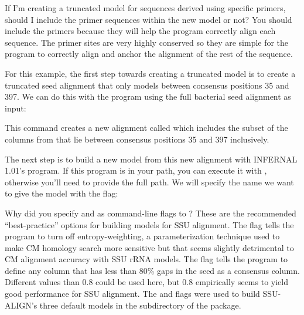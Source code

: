 \begin{srefaq}{If I'm creating a truncated model for sequences derived
    using specific primers, should I include the primer sequences
    within the new model or not?} You should include the primers
  because they will help the program correctly align each
  sequence. The primer sites are very highly conserved so they are
  simple for the program to correctly align and anchor the alignment
  of the rest of the sequence.
\end{srefaq}

For this example, the first step towards creating a truncated model is
to create a truncated seed alignment that only models between
consensus positions 35 and 397. We can do this with the
 program using the full bacterial seed alignment as
input:


This command creates a new alignment called  which
includes the subset of the columns from  that lie
between consensus positions 35 and 397 inclusively.

The next step is to build a new model from this new alignment with
INFERNAL 1.01's  program. If this program is in
your path, you can execute it with , otherwise you'll
need to provide the full path. We will specify the name we want
to give the model with the  flag:


\begin{srefaq}{Why did you specify  and
     as command-line flags to ?}
    These are the recommended ``best-practice'' options for building
    models for SSU alignment. The  flag tells the
    program to turn off entropy-weighting, a parameterization
    technique used to make CM homology search more sensitive
    \cite{NawrockiEddy07} but that seems slightly detrimental to CM
    alignment accuracy with SSU rRNA models. The  flag tells the program to define any column that has less
    than 80\% gaps in the seed as a consensus column. Different values
    than 0.8 could be used here, but 0.8 empirically seems to yield
    good performance for SSU alignment. The  and
     flags were used to build
    SSU-ALIGN's three default models in the 
    subdirectory of the package.
\end{srefaq}

